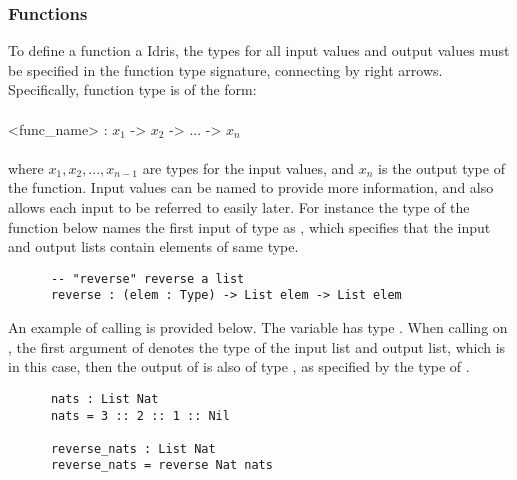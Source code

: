 
\subsubsection*{Functions}
To define a function a Idris, the types for all input values and output values must be specified in the function type signature, connecting by right arrows. Specifically, function type is of the form: 
\\\\
\tab <func\_name> : $x_1$ -> $x_2$ -> ... ->  $x_n$
\\\\
where $x_1, x_2, ..., x_{n-1}$ are types for the input values, and $x_n$ is the output type of the function. Input values can be named to provide more information, and also allows each input to be referred to easily later. For instance the type of the  function below names the first input of type  as , which specifies that the input and output lists contain elements of same type. 
\begin{lstlisting}
      -- "reverse" reverse a list
      reverse : (elem : Type) -> List elem -> List elem
\end{lstlisting}

An example of calling  is provided below. The variable  has type . When calling  on , the first argument of  denotes the type of the input list and output list, which is  in this case, then the output of  is also of type , as specified by the type of . 
\begin{lstlisting}
      nats : List Nat
      nats = 3 :: 2 :: 1 :: Nil
        
      reverse_nats : List Nat
      reverse_nats = reverse Nat nats
\end{lstlisting}

